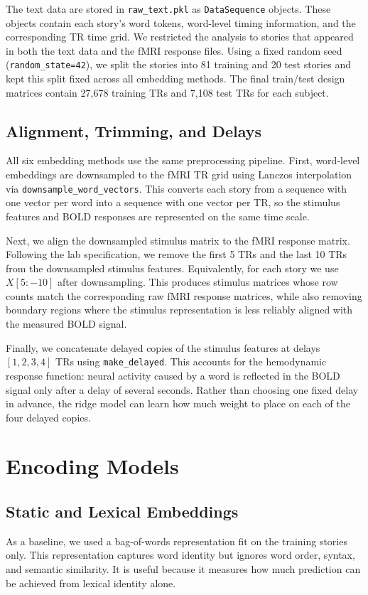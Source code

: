 \documentclass[11pt]{article}
\begin{document}
The text data are stored in \texttt{raw\_text.pkl} as \texttt{DataSequence} objects. These objects contain each story's word tokens, word-level timing information, and the corresponding TR time grid. We restricted the analysis to stories that appeared in both the text data and the fMRI response files. Using a fixed random seed (\texttt{random\_state=42}), we split the stories into 81 training and 20 test stories and kept this split fixed across all embedding methods. The final train/test design matrices contain 27,678 training TRs and 7,108 test TRs for each subject.

\subsection{Alignment, Trimming, and Delays}
All six embedding methods use the same preprocessing pipeline. First, word-level embeddings are downsampled to the fMRI TR grid using Lanczos interpolation via \texttt{downsample\_word\_vectors}. This converts each story from a sequence with one vector per word into a sequence with one vector per TR, so the stimulus features and BOLD responses are represented on the same time scale.

Next, we align the downsampled stimulus matrix to the fMRI response matrix. Following the lab specification, we remove the first 5 TRs and the last 10 TRs from the downsampled stimulus features. Equivalently, for each story we use $X[5:-10]$ after downsampling. This produces stimulus matrices whose row counts match the corresponding raw fMRI response matrices, while also removing boundary regions where the stimulus representation is less reliably aligned with the measured BOLD signal.

Finally, we concatenate delayed copies of the stimulus features at delays $[1,2,3,4]$ TRs using \texttt{make\_delayed}. This accounts for the hemodynamic response function: neural activity caused by a word is reflected in the BOLD signal only after a delay of several seconds. Rather than choosing one fixed delay in advance, the ridge model can learn how much weight to place on each of the four delayed copies.

\section{Encoding Models}
\subsection{Static and Lexical Embeddings}
As a baseline, we used a bag-of-words representation fit on the training stories only. This representation captures word identity but ignores word order, syntax, and semantic similarity. It is useful because it measures how much prediction can be achieved from lexical identity alone.
\end{document}
